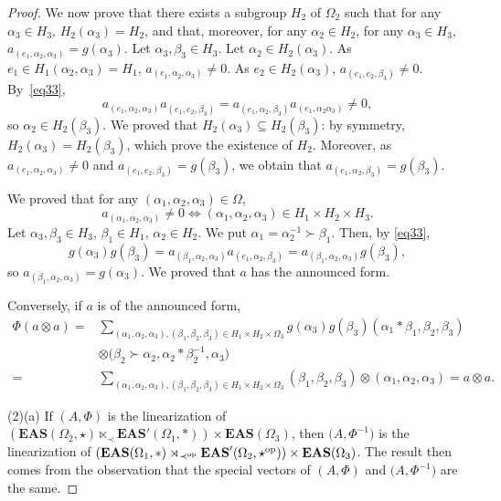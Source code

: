 \documentclass[pdftex]{sigma}
\numberwithin{equation}{section}
\newcommand{\eas}{\mathbf{EAS}}
\begin{document}
\begin{proof}
We now prove that there exists a subgroup $H_2$ of $\Omega_2$ such that for any $\alpha_3\in H_3$, $H_2(\alpha_3)=H_2$, and that, moreover, for any $\alpha_2\in H_2$, for any $\alpha_3\in H_3$, $a_{(e_1,\alpha_2,\alpha_3)}=g(\alpha_3)$.
Let $\alpha_3,\beta_3\in H_3$. Let $\alpha_2\in H_2(\alpha_3)$. As $e_1\in H_1(\alpha_2,\alpha_3)=H_1$, $a_{(e_1,\alpha_2,\alpha_3)}\neq 0$. As $e_2\in H_2(\alpha_3)$, $a_{(e_1,e_2,\beta_3)}\neq 0$. By~\eqref{eq33},
\[a_{(e_1,\alpha_2,\alpha_3)}a_{(e_1,e_2,\beta_3)}=a_{(e_1,\alpha_2,\beta_3)}a_{(e_1,\alpha_2\alpha_3)}\neq 0,\]
so $\alpha_2\in H_2(\beta_3)$. We proved that $H_2(\alpha_3)\subseteq H_2(\beta_3)$: by symmetry, $H_2(\alpha_3)=H_2(\beta_3)$, which prove the existence of $H_2$.
Moreover, as $a_{(e_1,\alpha_2,\alpha_3)}\neq 0$ and $a_{(e_1,e_2,\beta_3)}=g(\beta_3)$, we obtain that $a_{(e_1,\alpha_2,\beta_3)}=g(\beta_3)$.

We proved that for any $(\alpha_1,\alpha_2,\alpha_3)\in \Omega$,
\[a_{(\alpha_1,\alpha_2,\alpha_3)}\neq 0\Longleftrightarrow (\alpha_1,\alpha_2,\alpha_3)\in H_1\times H_2\times H_3.\]
Let $\alpha_3,\beta_3\in H_3$, $\beta_1\in H_1$, $\alpha_2\in H_2$. We put $\alpha_1=\alpha_2^{-1}\succ \beta_1$. Then, by \eqref{eq33},
\[g(\alpha_3)g(\beta_3)=a_{(\beta_1,\alpha_2,\alpha_3)}a_{(e_1,\alpha_2,\beta_3)}=a_{(\beta_1,\alpha_2,\alpha_3)}g(\beta_3),\]
so $a_{(\beta_1,\alpha_2,\alpha_3)}=g(\alpha_3)$. We proved that $a$ has the announced form.

Conversely, if $a$ is of the announced form,
\begin{align*}
\Phi(a\otimes a)={}&\sum_{(\alpha_1,\alpha_2,\alpha_3),(\beta_1,\beta_2,\beta_3)\in H_1\times H_2\times \Omega_3}g(\alpha_3)g(\beta_3)(\alpha_1*\beta_1,\beta_2,\beta_3)\\
&\otimes \bigl(\beta_2\succ \alpha_2,\alpha_2*\beta_2^{-1},\alpha_3\bigr)\\
={}&\sum_{(\alpha_1,\alpha_2,\alpha_3),(\beta_1,\beta_2,\beta_3)\in H_1\times H_2\times \Omega_3}(\beta_1,\beta_2,\beta_3)\otimes (\alpha_1,\alpha_2,\alpha_3)
=a\otimes a.
\end{align*}

(2)(a) If $(A,\Phi)$ is the linearization of $(\eas(\Omega_2,\star) \ltimes_\prec \eas'(\Omega_1,*))\times \eas(\Omega_3)$, then $\bigl(A,\Phi^{-1}\bigr)$ is the linearization of $(\eas(\Omega_1,*) \rtimes_{\prec^{\rm op}} \eas'(\Omega_2,\star^{\rm op}))\times \eas(\Omega_3)$.
The result then comes from the observation that the special vectors of $(A,\Phi)$ and $\bigl(A,\Phi^{-1}\bigr)$ are the same.


\end{proof}
\end{document}
